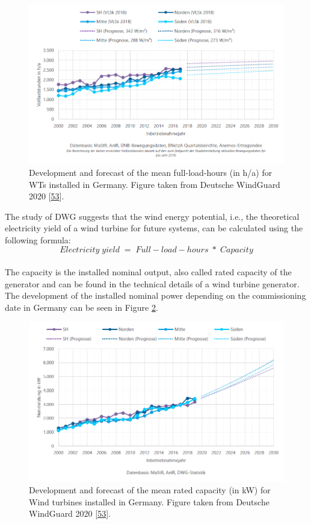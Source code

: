 \documentclass[a4paper,11pt]{article}
\begin{document}
\begin{figure}[H]

{\centering \includegraphics[width=1\linewidth]{figures/DWG/DWG_Volllaststunden} 

}

\caption{Development and forecast of the mean full-load-hours (in h/a) for WTs installed in Germany. Figure taken from Deutsche WindGuard 2020 {[}\protect\hyperlink{ref-RasmusBorrmannDr.KnudRehfeldtDr.DennisKruse.2020}{53}{]}.}\label{fig:flh}
\end{figure}
The study of DWG suggests that the wind energy potential, i.e., the theoretical electricity yield of a wind turbine for future systems, can be calculated using the following formula:
\[
Electricity\;yield\; =\; Full-load-hours\; *\; Capacity
\]\\
The capacity is the installed nominal output, also called rated capacity of the generator and can be found in the technical details of a wind turbine generator. The development of the installed nominal power depending on the commissioning date in Germany can be seen in Figure \ref{fig:capacity}.
\begin{figure}[H]

{\centering \includegraphics[width=1\linewidth]{figures/DWG/DWG_Nennleistung} 

}

\caption{Development and forecast of the mean rated capacity (in kW) for Wind turbines installed in Germany. Figure taken from Deutsche WindGuard 2020 {[}\protect\hyperlink{ref-RasmusBorrmannDr.KnudRehfeldtDr.DennisKruse.2020}{53}{]}.}\label{fig:capacity}
\end{figure}
\end{document}
